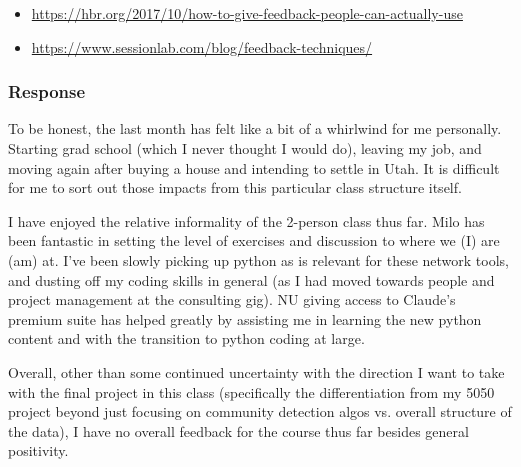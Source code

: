 \documentclass{article}
\newcommand{\response}{\subsubsection*{Response}}
\begin{document}
\begin{itemize}
    \item \url{https://hbr.org/2017/10/how-to-give-feedback-people-can-actually-use}
    \item \url{https://www.sessionlab.com/blog/feedback-techniques/}
\end{itemize}

\response
To be honest, the last month has felt like a bit of a whirlwind for me personally. Starting grad school (which I never thought I would do), leaving my job, and moving again after buying a house and intending to settle in Utah. It is difficult for me to sort out those impacts from this particular class structure itself.

I have enjoyed the relative informality of the 2-person class thus far. Milo has been fantastic in setting the level of exercises and discussion to where we (I) are (am) at. I've been slowly picking up python as is relevant for these network tools, and dusting off my coding skills in general (as I had moved towards people and project management at the consulting gig). NU giving access to Claude's premium suite has helped greatly by assisting me in learning the new python content and with the transition to python coding at large. 

Overall, other than some continued uncertainty with the direction I want to take with the final project in this class (specifically the differentiation from my 5050 project beyond just focusing on community detection algos vs. overall structure of the data), I have no overall feedback for the course thus far besides general positivity. 
\end{document}
